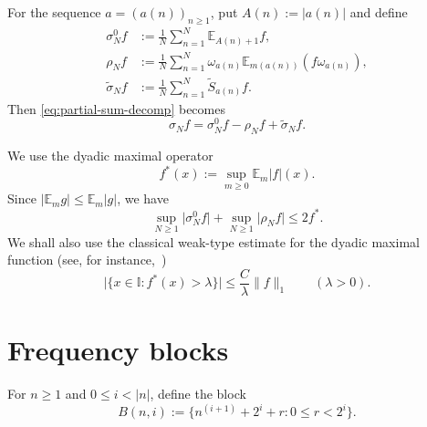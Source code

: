 \documentclass[11pt]{amsart}
\numberwithin{equation}{section}
\theoremstyle{remark}
\begin{document}
For the sequence $a=(a(n))_{n\ge1}$, put $A(n):=|a(n)|$ and define 
\begin{align}
\sigma_N^0 f&:=\frac1N\sum_{n=1}^N \mathbb{E}_{A(n)+1}f,
\label{eq:sigma0-def} \\
\rho_N f&:=\frac1N\sum_{n=1}^N \omega_{a(n)}\mathbb{E}_{m(a(n))}(f%
\omega_{a(n)}),  \label{eq:rho-def} \\
\widetilde\sigma_N f&:=\frac1N\sum_{n=1}^N \widetilde S_{a(n)}f.
\label{eq:sigma-tilde-def}
\end{align}
Then \eqref{eq:partial-sum-decomp} becomes 
\begin{equation}
\sigma_N f=\sigma_N^0 f-\rho_N f+\widetilde\sigma_N f.
\label{eq:sigma-splitting}
\end{equation}

We use the dyadic maximal operator 
\begin{equation*}
f^*(x):=\sup_{m\ge0}\mathbb{E}_m\lvert f\rvert(x). 
\end{equation*}
Since $\lvert \mathbb{E}_m g\rvert\le \mathbb{E}_m\lvert g\rvert$, we have 
\begin{equation}
\sup_{N\ge1}\lvert \sigma_N^0 f\rvert+\sup_{N\ge1}\lvert \rho_N f\rvert \le
2f^*.  \label{eq:max-first-pieces}
\end{equation}
We shall also use the classical weak-type estimate for the dyadic maximal
function (see, for instance,~\cite{SchippBook}) 
\begin{equation}
\lvert \{x\in\mathbb{I}:f^*(x)>\lambda\}\rvert \le \frac{C}{\lambda}\lVert
f\rVert_1 \qquad (\lambda>0).  \label{eq:dyadic-maximal-weak}
\end{equation}

\section{Frequency blocks}

For $n\ge1$ and $0\le i<|n|$, define the block 
\begin{equation}
B(n,i):=\bigl\{n^{(i+1)}+2^i+r:0\le r<2^i\bigr\}.  \label{eq:block-def}
\end{equation}
\end{document}
